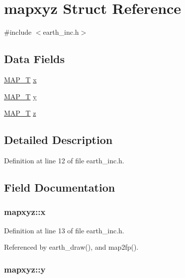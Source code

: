 \hypertarget{structmapxyz}{\section{mapxyz Struct Reference}
\label{structmapxyz}
}


{\ttfamily \#include $<$earth\-\_\-inc.\-h$>$}

\subsection*{Data Fields}
\begin{DoxyCompactItemize}
\item 
\hyperlink{earth__inc_8h_a4c939ba62f3338571903e40156a298a3}{M\-A\-P\-\_\-\-T} \hyperlink{structmapxyz_ae2e401592c4f9b80d062d40e890627c2}{x}
\item 
\hyperlink{earth__inc_8h_a4c939ba62f3338571903e40156a298a3}{M\-A\-P\-\_\-\-T} \hyperlink{structmapxyz_abe650f0d36303097bbca85cdcd9e375d}{y}
\item 
\hyperlink{earth__inc_8h_a4c939ba62f3338571903e40156a298a3}{M\-A\-P\-\_\-\-T} \hyperlink{structmapxyz_a96c5540931e4b70342cad5f87917cb4d}{z}
\end{DoxyCompactItemize}


\subsection{Detailed Description}


Definition at line 12 of file earth\-\_\-inc.\-h.



\subsection{Field Documentation}
\hypertarget{structmapxyz_ae2e401592c4f9b80d062d40e890627c2}{
\subsubsection[{x}]{ mapxyz\-::x}}\label{structmapxyz_ae2e401592c4f9b80d062d40e890627c2}


Definition at line 13 of file earth\-\_\-inc.\-h.



Referenced by earth\-\_\-draw(), and map2fp().

\hypertarget{structmapxyz_abe650f0d36303097bbca85cdcd9e375d}{
\subsubsection[{y}]{ mapxyz\-::y}}\label{structmapxyz_abe650f0d36303097bbca85cdcd9e375d}


